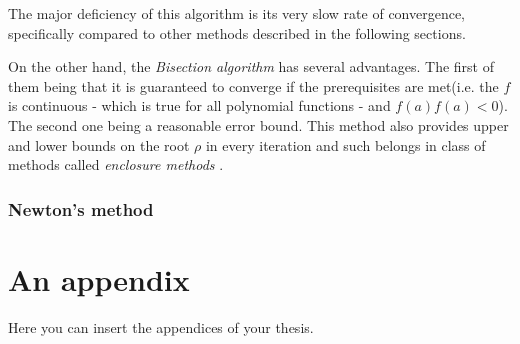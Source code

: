 \documentclass[
  digital, %
  table,   %
  nolof,     %
  nolot,     %
	draft, %
]{fithesis3}
\begin{document}
The major deficiency of this algorithm is its very slow rate of convergence, specifically compared to other methods described in the following sections.

On the other hand, the \textit{Bisection algorithm} has several advantages. The first of them being that it is guaranteed to converge if the prerequisites are met(i.e. the $f$ is continuous - which is true for all polynomial functions - and $f(a)f(a) < 0$). The second one being a reasonable error bound. This method also provides upper and lower bounds on the root $\rho$ in every iteration and such belongs in class of methods called \textit{enclosure methods} \parencite{rootApproxMeth}.


\subsection{Newton's method}

\printbibliography[heading=bibintoc]


  \makeatletter\thesis@blocks@clear\makeatother
  \printindex

\appendix %
\chapter{An appendix}
Here you can insert the appendices of your thesis.
\end{document}
